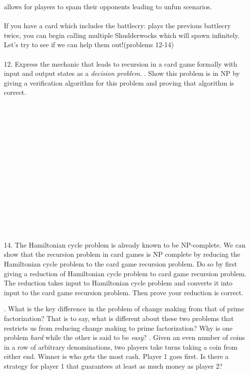 \documentclass[12pt]{article}
\begin{document}
 allows for players to spam their opponents leading to unfun scenarios.\\\\
 If you have a card which includes the battlecry: plays the previous battlecry twice, you can begin 
 calling multiple Shudderwocks which will spawn infinitely. Let's try to see if we can help them out!(problems 12-14)\\\\
12. Express the mechanic that leads to recursion in a card game formally with input and output states as a \textit{decision problem}.
\newpage
{}. Show this problem is in NP by giving a verification algorithm for this problem and proving that algorithm is correct. \\\\\\\\\\\\\\\\\\\\\\\\\\\\\\\\
14. The Hamiltonian cycle problem is already known to be NP-complete. We can show that the recursion problem in card games is NP complete by reducing the Hamiltonian cycle problem to the card game recursion problem. Do so by first giving a reduction of Hamiltonian cycle problem to card game recursion problem. The reduction takes input to Hamiltonian cycle problem and converts it into input to the card game recursion problem. Then prove your reduction is correct.

\newpage
{}. What is the key difference in the problem of change making from that of prime factorization? That is to say,
what is different about these two problems that restricts us from reducing change making to prime factorization? Why is one problem 
\textit{hard} while the other is said to be \textit{easy}? 
\newpage
{}. Given an even number of coins in a row of arbitrary denominations, two players take turns taking a coin from either end. 
Winner is who gets the most cash. Player 1 goes first. 
Is there a strategy for player 1 that guarantees at least as much money as player 2?
\end{document}
